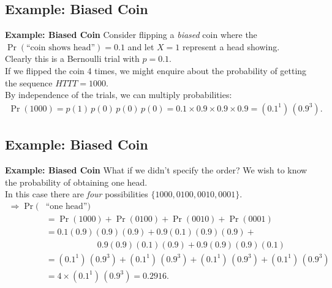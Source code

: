 \documentclass[compress]{beamer}        %
\makeatletter
\newcommand{\tcb}{\textcolor{beamer@blendedblue}}
\makeatother
\begin{document}
\subsection{Example: Biased Coin}
\begin{frame}{\bf \tcb{Example: Biased Coin}}
Consider flipping a \emph{biased} coin where the $\Pr(\text{``coin shows head''}) = 0.1$ and let $X = 1$ represent a head showing.\\[0.3cm]

Clearly this is a Bernoulli trial with $p = 0.1$.\\[0.8cm]

If we flipped the coin 4 times, we might enquire about the probability of getting the sequence $HTTT = 1000$.\\[0.6cm]

By independence of the trials, we can multiply probabilities:
\begin{align*}
\Pr(1000) = p(1)\,p(0)\,p(0)\,p(0) = 0.1\times0.9\times0.9\times0.9 = (0.1^1)\,(0.9^3).
\end{align*}

\end{frame}


\subsection{Example: Biased Coin}
\begin{frame}{\bf \tcb{Example: Biased Coin}}
What if we didn't specify the order? We wish to know the probability of obtaining one head.\\[0.3cm]

In this case there are \emph{four} possibilities $\{1000,0100,0010,0001\}$.\\[-0.1cm]
\begin{align*}
\Rightarrow \Pr(&\text{``one head''}) \\
&= \Pr(1000) + \Pr(0100) + \Pr(0010) + \Pr(0001) \\[0.4cm]
&=0.1(0.9)(0.9)(0.9) + 0.9(0.1)(0.9)(0.9) + \\
&\qquad\qquad\qquad0.9(0.9)(0.1)(0.9) + 0.9(0.9)(0.9)(0.1) \\[0.4cm]
&= (0.1^1)\,(0.9^3) + (0.1^1)\,(0.9^3) + (0.1^1)\,(0.9^3) + (0.1^1)\,(0.9^3)\\[0.4cm]
&= 4 \times (0.1^1)\, (0.9^3) = 0.2916.
\end{align*}

\end{frame}
\end{document}
